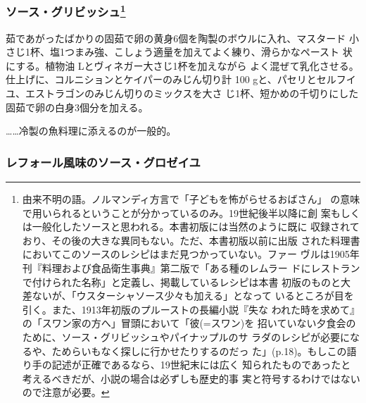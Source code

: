 \begin{recette}
{\subsubsection[ソース・グリビッシュ]{\texorpdfstring{ソース・グリビッシュ\footnote{由来不明の語。ノルマンディ方言で「子どもを怖がらせるおばさん」
  の意味で用いられるということが分かっているのみ。19世紀後半以降に創
  案もしくは一般化したソースと思われる。本書初版には当然のように既に
  収録されており、その後の大きな異同もない。ただ、本書初版以前に出版
  された料理書においてこのソースのレシピはまだ見つかっていない。ファー
  ヴルは1905年刊『料理および食品衛生事典』第二版で「ある種のレムラー
  ドにレストランで付けられた名称」と定義し、掲載しているレシピは本書
  初版のものと大差ないが、「ウスターシャソース少々も加える」となって
  いるところが目を引く。また、1913年初版のプルーストの長編小説『失な
  われた時を求めて』の「スワン家の方へ」冒頭において「彼(=スワン)を
  招いていない夕食会のために、ソース・グリビッシュやパイナップルのサ
  ラダのレシピが必要になるや、ためらいもなく探しに行かせたりするのだっ
  た」(p.18)。もしこの語り手の記述が正確であるなら、19世紀末には広く
  知られたものであったと考えるべきだが、小説の場合は必ずしも歴史的事
  実と符号するわけではないので注意が必要。}}{ソース・グリビッシュ}}\label{sauce-gribiche}}



茹であがったばかりの固茹で卵の黄身6個を陶製のボウルに入れ、マスタード
小さじ1杯、塩1つまみ強、こしょう適量を加えてよく練り、滑らかなペースト
状にする。植物油\undemi{} Lとヴィネガー大さじ1\undemi{}杯を加えながら
よく混ぜて乳化させる。仕上げに、コルニションとケイパーのみじん切り計 100
gと、パセリとセルフイユ、エストラゴンのみじん切りのミックスを大さ
じ1杯、短かめの千切りにした固茹で卵の白身3個分を加える。

\ldots{}\ldots{}冷製の魚料理に添えるのが一般的。

\hypertarget{sauce-groseilles-au-raifort}{%
\subsubsection{レフォール風味のソース・グロゼイユ}\label{sauce-groseilles-au-raifort}}


\end{recette}
